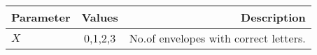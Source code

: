 \begin{tabular}{|l|c|r|}
    \hline
    Parameter & Values & Description\\
    \hline
    $X $ & 0,1,2,3 & No.of envelopes with correct letters.\\
    \hline
\end{tabular}
